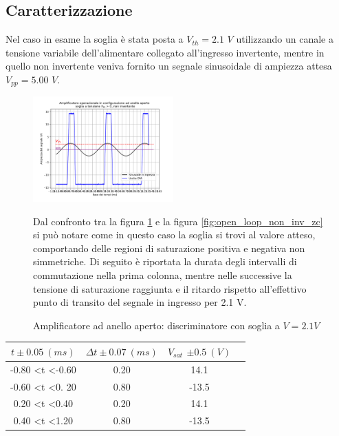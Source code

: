 \documentclass[journal]{IEEEtran}
\begin{document}
\subsection{\textbf{Caratterizzazione}}
Nel caso in esame la soglia è stata posta a $V_{th} = 2.1$ $V$ utilizzando un canale a tensione variabile dell'alimentare collegato all'ingresso invertente, mentre in quello non invertente veniva fornito un segnale sinusoidale di ampiezza attesa $V_{pp} = 5.00$ $V$.

\begin{figure}[H]%
\begin {center}
\includegraphics[width=0.48\textwidth]{analysis/output/OPA-open-loop-biased_threshold.pdf}
\caption{Amplificatore ad anello aperto: discriminatore con soglia a $V = 2.1 V$}
\label{fig:biased_cross}
\end {center}


Dal confronto tra la figura \ref{fig:biased_cross} e la figura \ref{fig:open_loop_non_inv_zc} si può notare come in questo caso la soglia si trovi al valore atteso, comportando delle regioni di saturazione positiva e negativa non simmetriche. Di seguito è riportata la durata degli intervalli di commutazione nella prima colonna, mentre nelle successive la tensione di saturazione raggiunta e il ritardo rispetto all'effettivo punto di transito del segnale in ingresso per 2.1 V.
\end{figure}

\begin{tabular}{|c|c|c|c|}

\hline
$t  \pm 0.05 \ (ms)$ & $\Delta t \pm 0.07 \ (ms)$ & $V_{sat}$ $\pm 0.5 \ (V)$  \\ \hline
-0.80 \textless t \textless -0.60 & 0.20 & 14.1 \\ \hline %
-0.60 \textless t \textless 0. 20 & 0.80 & -13.5 \\ \hline %
0.20 \textless t \textless 0.40   & 0.20 & 14.1\\ \hline   %
0.40 \textless t \textless 1.20   & 0.80 & -13.5 \\ \hline %
\end{tabular}
\end{document}
